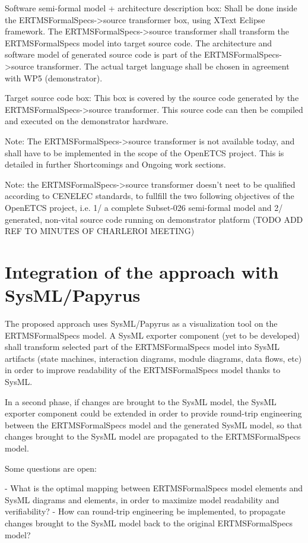 Software semi-formal model + architecture description box: Shall be done inside the ERTMSFormalSpecs->source transformer box, using XText Eclipse framework.
The ERTMSFormalSpecs->source transformer shall transform the ERTMSFormalSpecs model into target source code. The architecture and software model of generated source code is part of the ERTMSFormalSpecs->source transformer. The actual target language shall be chosen in agreement with WP5 (demonstrator).

Target source code box: This box is covered by the source code generated by the ERTMSFormalSpecs->source transformer. This source code can then be compiled and executed on the demonstrator hardware.

Note: The ERTMSFormalSpecs->source transformer is not available today, and shall have to be implemented in the scope of the OpenETCS project. This is detailed in further Shortcomings and Ongoing work sections.

Note: the ERTMSFormalSpecs->source transformer doesn't neet to be qualified according to CENELEC standards, to fullfill the two following objectives of the OpenETCS project, i.e. 1/ a complete Subset-026 semi-formal model and 2/ generated, non-vital source code running on demonstrator platform (TODO ADD REF TO MINUTES OF CHARLEROI MEETING)

\section{Integration of the approach with SysML/Papyrus}

The proposed approach uses SysML/Papyrus as a visualization tool on the ERTMSFormalSpecs model. A SysML exporter component (yet to be developed) shall transform selected part of the ERTMSFormalSpecs model into SysML artifacts (state machines, interaction diagrams, module diagrams, data flows, etc) in order to improve readability of the ERTMSFormalSpecs model thanks to SysML. 

In a second phase, if changes are brought to the SysML model, the SysML exporter component could be extended in order to provide round-trip engineering between the ERTMSFormalSpecs model and the generated SysML model, so that changes brought to the SysML model are propagated to the ERTMSFormalSpecs model.

Some questions are open:

- What is the optimal mapping between ERTMSFormalSpecs model elements and SysML diagrams and elements, in order to maximize model readability and verifiability? 
- How can round-trip engineering be implemented, to propagate changes brought to the SysML model back to the original ERTMSFormalSpecs model?


